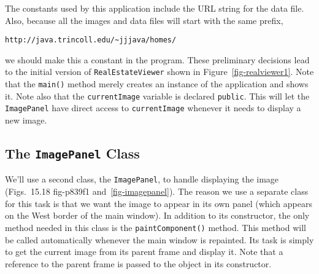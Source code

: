 The constants used by this application include the URL string for the
data file. Also, because all the
images and data files will start with the same prefix,

\begin{jjjlisting}
\begin{lstlisting}[commentstyle=\color{black}]
http://java.trincoll.edu/~jjjava/homes/
\end{lstlisting}
\end{jjjlisting}

\noindent we should make this a constant in the program.  These preliminary
decisions lead to the initial version of {\tt RealEstateViewer} shown
in Figure~\ref{fig-realviewer1}. Note that the {\tt main()} method
merely creates an instance of the application and shows it.  Note also
that the {\tt currentImage} variable is declared {\tt public}. This
will let the {\tt ImagePanel} have direct access to {\tt currentImage}
whenever it needs to display a new image.

\pagebreak
\subsection*{The {\tt ImagePanel} Class}
\noindent We'll use a second class, the {\tt ImagePanel}, to handle 
displaying  the image (Figs.~15.18
{fig-p839f1}
and~\ref{fig-imagepanel}). The reason we use a separate class for this
task is that we want the image to appear in its own panel (which
appears on the West border of the main window). In addition to its
constructor, the only method needed in this class
is the {\tt paintComponent()} method.  This method will be called
automatically whenever the main window is repainted.  Its task is
simply to get the current image from its parent frame and display
it.  Note that a reference to the parent frame is passed to the object
in its constructor.

